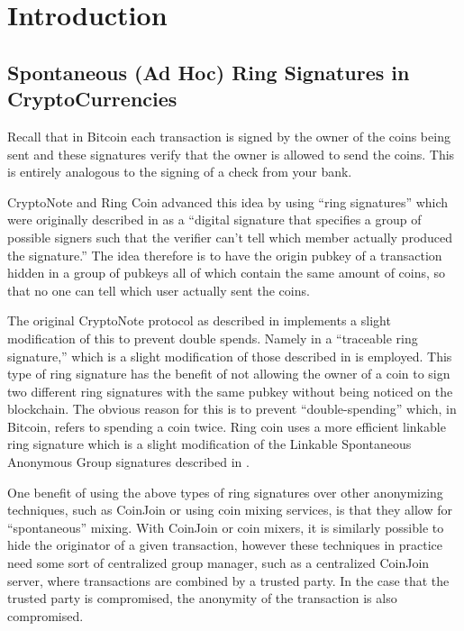 \documentclass[12pt,english]{mrl}
\theoremstyle{definition}
\numberwithin{equation}{section}
\numberwithin{figure}{section}
\numberwithin{equation}{section}
\numberwithin{equation}{section}
\numberwithin{figure}{section}
\begin{document}

\section{Introduction}


\subsection{Spontaneous (Ad Hoc) Ring Signatures in CryptoCurrencies}

Recall that in Bitcoin each transaction is signed by the owner of
the coins being sent and these signatures verify that the owner is
allowed to send the coins. This is entirely analogous to the signing
of a check from your bank.

CryptoNote \cite{CN} and Ring Coin
\cite{B2} advanced this idea by using ``ring signatures'' which were originally described
in \cite{RST} as a ``digital signature that specifies a group of
possible signers such that the verifier can't tell which member actually
produced the signature.'' The idea therefore is to have the origin
pubkey of a transaction hidden in a group of pubkeys all of which contain
the same amount of coins, so that no one can tell which user actually
sent the coins. 

The original CryptoNote protocol as described in \cite{CN}
implements a slight modification of this to prevent double spends.
Namely in \cite{CN} a ``traceable ring signature,'' which is a slight modification of those described in 
\cite{FS} is employed. This type of ring signature has the benefit of not allowing the owner of a coin to
sign two different ring signatures with the same pubkey without being
noticed on the blockchain. The obvious reason for this is to prevent
``double-spending'' which, in Bitcoin, refers to
spending a coin twice. Ring coin \cite{B2,B} uses a more efficient linkable
ring signature which is a slight modification of the Linkable Spontaneous
Anonymous Group signatures described in \cite{LWW}.

One benefit of using the above types of ring signatures over other anonymizing techniques, such as CoinJoin \cite{GMc} or using coin mixing services,
is that they allow for ``spontaneous'' mixing. With CoinJoin or coin mixers, it is
similarly possible to hide the originator of a given transaction,
however these techniques in practice need some sort of centralized group manager, such as a centralized CoinJoin server, where transactions
are combined by a trusted party. In the case that the trusted party is compromised,
the anonymity of the transaction is also compromised. 
\end{document}
